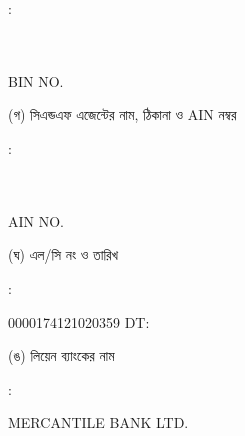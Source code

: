 \documentclass[12pt]{article}
\newcommand{\lcno}{0000174121020359}
\newcommand{\lcdt}{}
\newcommand{\lienbank}{MERCANTILE BANK LTD.}
\newcommand{\impn}{\jeal}
\newcommand{\impadd}{\jeala}
\newcommand{\impbin}{\jealbin}
\begin{document}
\begin{minipage}[t]{0.02\linewidth}
:
\end{minipage}
\begin{minipage}[t]{0.53\linewidth}
\textbf{{\impn}}
\\
{\impadd}
\\
BIN NO. {\impbin}
\\
\end{minipage}
\begin{minipage}[t]{0.05\linewidth}
\hspace*{1em}
\end{minipage}
\begin{minipage}[t]{0.40\linewidth}
(গ) সিএন্ডএফ এজেন্টের নাম, ঠিকানা
ও AIN নম্বর
\end{minipage}
\begin{minipage}[t]{0.02\linewidth}
:
\end{minipage}
\begin{minipage}[t]{0.53\linewidth}
\textbf{{\cnfn}}
\\
{\cnfadd}
\\
AIN NO. {\cnfain}
\\
\end{minipage}
\begin{minipage}[t]{0.05\linewidth}
\hspace*{1em}
\end{minipage}
\begin{minipage}[t]{0.40\linewidth}
(ঘ) এল/সি নং ও তারিখ
\end{minipage}
\begin{minipage}[t]{0.02\linewidth}
:
\end{minipage}
\begin{minipage}[t]{0.53\linewidth}
{\lcno} \hspace{2em} DT: {\lcdt}
\\
\end{minipage}
\begin{minipage}[t]{0.05\linewidth}
\hspace*{1em}
\end{minipage}
\begin{minipage}[t]{0.40\linewidth}
(ঙ) লিয়েন ব্যাংকের নাম
\end{minipage}
\begin{minipage}[t]{0.02\linewidth}
:
\end{minipage}
\begin{minipage}[t]{0.53\linewidth}
{\lienbank}
\\
\end{minipage}
\end{document}
